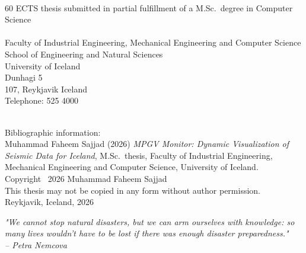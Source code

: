 \documentclass[12pt]{article}
\begin{document}

\clearpage
\thispagestyle{empty}
\vspace*{\fill}
\renewcommand{\baselinestretch}{1.5}\normalsize
{} \\
60 ECTS thesis submitted in partial fulfillment of a M.Sc.\ degree in Computer Science \\ \\
Faculty of Industrial Engineering, Mechanical Engineering and Computer Science \\
School of Engineering and Natural Sciences \\
University of Iceland \\
Dunhagi 5 \\
107, Reykjavik
Iceland \\
Telephone: 525 4000 \\ \\

\vspace*{\lineskip}

Bibliographic information: \\
Muhammad Faheem Sajjad (2026) \emph{MPGV Monitor: Dynamic Visualization of Seismic Data for Iceland}, M.Sc.\ thesis, Faculty of Industrial Engineering, Mechanical Engineering and Computer Science, University of Iceland.\\

Copyright \textcopyright~2026 Muhammad Faheem Sajjad \\
This thesis may not be copied in any form without author permission.\\

Reykjavik, Iceland, 2026 \\
\renewcommand{\baselinestretch}{1.0}\normalsize
\newpage


\clearpage
\null
\thispagestyle{empty} %
\newpage

\thispagestyle{empty}
\vfill %
\begin{flushright}
\textit{"We cannot stop natural disasters, but we can arm ourselves with knowledge: so many lives wouldn’t have to be lost if there was enough disaster preparedness."}\\
\textit{– Petra Nemcova}
\end{flushright}
\end{document}
